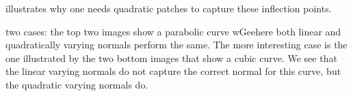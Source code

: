 	 illustrates why one needs quadratic patches to capture these inflection points. 

	two cases: the top two images show a parabolic curve wGeehere both linear and quadratically varying normals perform the same. The more interesting case is the one illustrated by the two bottom images that show a cubic curve. We see that the linear varying normals do not capture the correct normal for this curve, but the quadratic varying normals do.



